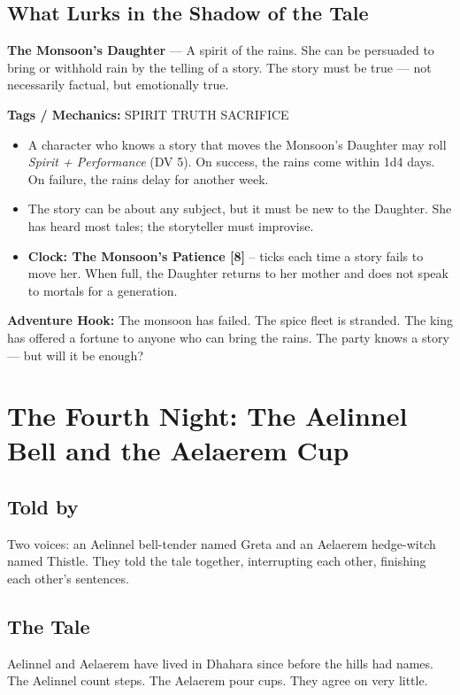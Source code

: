 \documentclass[10pt,twoside]{book}
\newcommand{\tag}[1]{\textsc{#1}}
\begin{document}
\section*{What Lurks in the Shadow of the Tale}
\begin{infobox}
\textbf{The Monsoon's Daughter} --- A spirit of the rains. She can be persuaded to bring or withhold rain by the telling of a story. The story must be true --- not necessarily factual, but emotionally true.

\textbf{Tags / Mechanics:} \tag{SPIRIT} \tag{TRUTH} \tag{SACRIFICE}

\begin{itemize}
\item A character who knows a story that moves the Monsoon's Daughter may roll \textit{Spirit + Performance} (DV 5). On success, the rains come within 1d4 days. On failure, the rains delay for another week.
\item The story can be about any subject, but it must be new to the Daughter. She has heard most tales; the storyteller must improvise.
\item \textbf{Clock: The Monsoon's Patience [8]} -- ticks each time a story fails to move her. When full, the Daughter returns to her mother and does not speak to mortals for a generation.
\end{itemize}

\textbf{Adventure Hook:} The monsoon has failed. The spice fleet is stranded. The king has offered a fortune to anyone who can bring the rains. The party knows a story --- but will it be enough?
\end{infobox}

\chapter{The Fourth Night: The Aelinnel Bell and the Aelaerem Cup}

\section*{Told by}
Two voices: an Aelinnel bell-tender named Greta and an Aelaerem hedge-witch named Thistle. They told the tale together, interrupting each other, finishing each other's sentences.

\section*{The Tale}
Aelinnel and Aelaerem have lived in Dhahara since before the hills had names. The Aelinnel count steps. The Aelaerem pour cups. They agree on very little.
\end{document}
